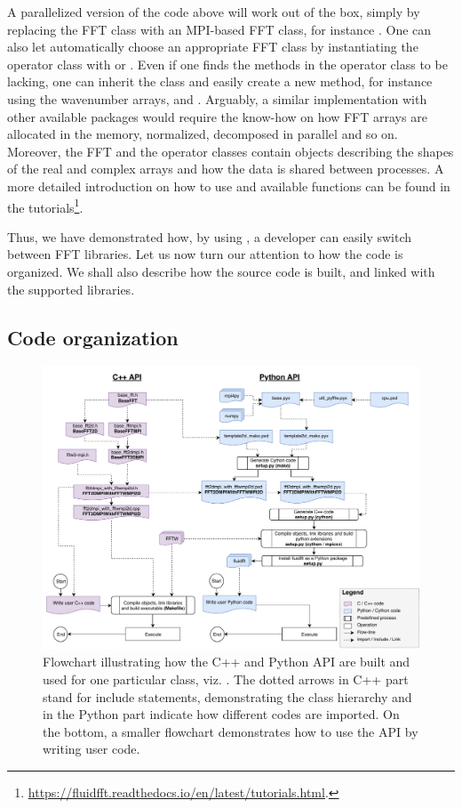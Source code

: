A parallelized version of the code above will work out of the box, simply by
replacing the FFT class with an MPI-based FFT class, for instance
. One can also let  automatically
choose an appropriate FFT class by instantiating the operator class with
 or . Even if one finds the methods
in the operator class to be lacking, one can inherit the class and easily create a
new method, for instance using the wavenumber arrays,  and
.  Arguably, a similar implementation with other available
packages would require the know-how on how FFT arrays are allocated in the memory,
normalized, decomposed in parallel and so on.
%
Moreover, the FFT and the operator classes contain objects describing the shapes
of the real and complex arrays and how the data is shared between processes.
%
A more detailed introduction on how
to use  and available functions can be found in the
tutorials\footnote{%
\url{https://fluidfft.readthedocs.io/en/latest/tutorials.html}.}.

Thus, we have demonstrated how, by using , a developer can
easily switch between FFT libraries.
%
Let us now turn our attention to how the code is organized. We shall also describe
how the source code is built, and linked with the supported libraries.

\subsection{Code organization}
\begin{figure}[htp]
  \centering
  \includegraphics[width=0.96\linewidth]{Pyfig/fig_build_use}
  \caption{Flowchart illustrating how the C++ and Python API are built and used
  for one particular class, viz. . The dotted
  arrows in C++ part stand for include statements, demonstrating the class
  hierarchy and in the Python part indicate how different codes are imported. On
  the bottom, a smaller flowchart demonstrates how to use the API by writing user
  code.  }\label{fig:build_use}
\end{figure}


